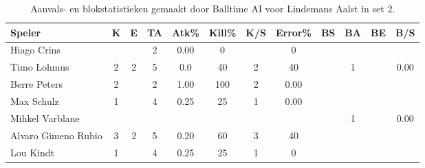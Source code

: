 \begin{table}[ht!]
  \centering
  \scriptsize
  \begin{tabular}{|l|c|c|c|c|c|c|c|c|c|c|c|} \hline
    \textbf{Speler} &  K & E & TA & Atk\% & Kill\% & K/S & Error\% & BS & BA & BE & B/S\\ \hline
    Hiago Crins &  &  & 2 & 0.00 & 0 &  & 0 &  &  &&\\
    Timo Lohmus & 2 & 2 & 5 & 0.0 & 40 & 2 & 40 &  & 1 & & 0.00 \\
    Berre Peters & 2 &  & 2 & 1.00 & 100 & 2 & 0.00 &   &  & & \\
    Max Schulz & 1 &  & 4 & 0.25 & 25 & 1 & 0.00 &   &  && \\
    Mihkel Varblane &   &   &   &   &   &   &   &  & 1 & & 0.00\\
    Alvaro Gimeno Rubio & 3 & 2 & 5 & 0.20 & 60 & 3 & 40 &   &  && \\
    Lou Kindt & 1 &  & 4 & 0.25 & 25 & 1 & 0 &   &  && \\ \hline
  \end{tabular}
  \caption[Aanvals- en blokstatistieken gemaakt door Balltime AI voor Lindemans Aalst in set 2]{\label{tab:PL3AttBlockAalstAI2}Aanvals- en blokstatistieken gemaakt door Balltime AI voor Lindemans Aalst in set 2.}
\end{table}
